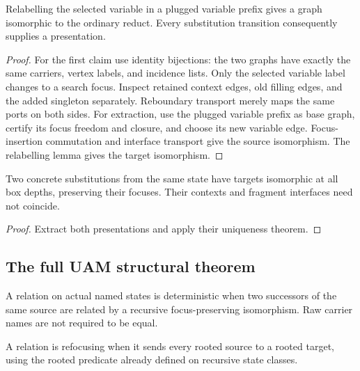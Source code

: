 \begin{lemma}
Relabelling the selected variable in a plugged variable prefix gives a graph
isomorphic to the ordinary reduct. Every substitution transition consequently
supplies a presentation.
\end{lemma}
\begin{proof}
For the first claim use identity bijections: the two graphs have exactly the
same carriers, vertex labels, and incidence lists. Only the selected variable
label changes to a search focus. Inspect retained context edges, old filling
edges, and the added singleton separately. Reboundary transport merely maps
the same ports on both sides. For extraction, use the plugged variable prefix
as base graph, certify its focus freedom and closure, and choose its new
variable edge. Focus-insertion commutation and interface transport give the
source isomorphism. The relabelling lemma gives the target isomorphism.
\end{proof}
\begin{theorem}
Two concrete substitutions from the same state have targets isomorphic at all
box depths, preserving their focuses. Their contexts and fragment interfaces
need not coincide.
\end{theorem}
\begin{proof}
Extract both presentations and apply their uniqueness theorem.
\end{proof}


\subsection{The full UAM structural theorem}

\begin{definition}
A relation on actual named states is deterministic when two successors of the
same source are related by a recursive focus-preserving isomorphism.
Raw carrier names are not required to be equal.
\end{definition}
\begin{definition}
A relation is refocusing when it sends every rooted source to a rooted target,
using the rooted predicate already defined on recursive state classes.
\end{definition}



